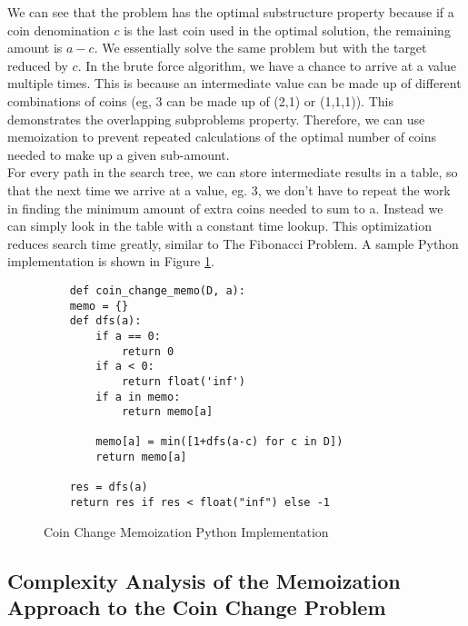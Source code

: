 We can see that the problem has the optimal substructure property because if a coin denomination $c$ is the last coin used in the optimal solution,
the remaining amount is $a-c$. We essentially solve the same problem but with the target reduced by $c$.
In the brute force algorithm, we have a chance to arrive at a value multiple times.
This is because an intermediate value can be made up of different combinations of coins (eg, 3 can be made up of (2,1) or (1,1,1)).
This demonstrates the overlapping subproblems property.
Therefore, we can use memoization to prevent repeated calculations of the optimal number of coins needed to make up a given sub-amount.\\
For every path in the search tree, we can store intermediate results in a table, so that the next time we arrive at a value, eg. 3, we don't have to repeat the work in finding the minimum amount of extra coins needed to sum to a.
Instead we can simply look in the table with a constant time lookup.
This optimization reduces search time greatly, similar to The Fibonacci Problem.
A sample Python implementation is shown in Figure \ref{fig:coin-change-memo}.

\begin{figure}[H]
    \centering
    \begin{lstlisting}
    def coin_change_memo(D, a):
    memo = {}
    def dfs(a):
        if a == 0:
            return 0
        if a < 0:
            return float('inf')
        if a in memo:
            return memo[a]
        
        memo[a] = min([1+dfs(a-c) for c in D])
        return memo[a]
            
    res = dfs(a)
    return res if res < float("inf") else -1
    \end{lstlisting}
    \caption{Coin Change Memoization Python Implementation}
    \label{fig:coin-change-memo}
\end{figure}

\subsection{Complexity Analysis of the Memoization Approach to the Coin Change Problem}\label{subsec:ca-coin-change-memo}

